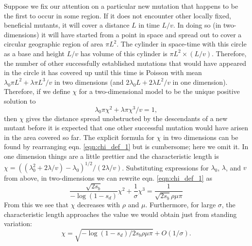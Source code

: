 \documentclass{article}
\begin{document}
Suppose we fix our attention on a particular new mutation that happens to be the first to occur in some region.
If it does not encounter other locally fixed, beneficial mutants,
it will cover a distance $L$ in time $L/v$. In doing so (in two-dimensions) it will have
started from a point in space and spread out to cover a circular geographic region of area $\pi L^2$.
The cylinder in space-time with this circle as a base and
height $L/v$ has volume of this cylinder is $\pi L^2 \times (L/v)$.
Therefore, the number of other successfully established mutations that
would have appeared in the circle it has covered up until this time is Poisson with mean
$\lambda_0 \pi L^2 + \lambda \pi L^3 /v$ in two dimensions
(and $2 \lambda_0 L + 2 \lambda L^2 /v$ in one dimension).
Therefore, if we define $\chi$ for a two-dimensional model to be the unique positive solution to
\begin{equation} \label{eqn:chi_def_1}
    \lambda_0 \pi \chi^2 + \lambda \pi \chi^3 /v = 1,
\end{equation}
then $\chi$ gives the distance spread unobstructed by the descendants of a new mutant
before it is expected that one other successful mutation would have arisen in the area covered so far.
The explicit formula for $\chi$ in two dimensions can be found by
rearranging eqn. \eqref{eqn:chi_def_1} but is cumbersome; here we omit
it. In one dimension things are a little prettier and the
characteristic length is $\chi = ( \left(\lambda_0^2 + 2 \lambda/v \right) - \lambda_0 )^{1/2}/( 2 \lambda / v )$.
Substituting expressions for $\lambda_0$, $\lambda$, and $v$ from above,
in two-dimensions we can rewrite eqn. \eqref{eqn:chi_def_1} as
\begin{equation} \label{eqn:defines_chi}
   \frac{\sqrt{2s_b} }{-\log(1-s_d) } \chi^2 + \frac{1}{\sigma} \chi^3 = \frac{1}{\sqrt{2s_b} \rho\mu\pi}
\end{equation}
From this we see that $\chi$ decreases with $\rho$ and $\mu$.
Furthermore, for large $\sigma$, the characteristic length approaches
the value we would obtain just from standing variation:
\begin{equation} \label{eqn:chi_standing}
\chi = \sqrt{ -\log(1-s_d) / 2 s_b \rho \mu \pi } + O(1/\sigma).
\end{equation}
\end{document}
